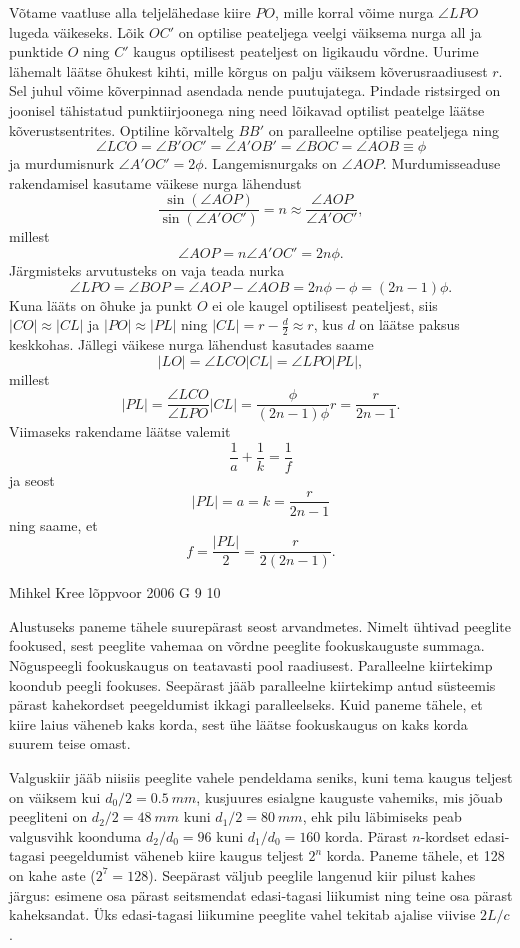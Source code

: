\documentclass[11pt]{article}
\begin{document}
{{Võtame vaatluse alla teljelähedase kiire $PO$, mille korral võime nurga $\angle LPO$ lugeda väikeseks. Lõik $OC'$ on optilise peateljega veelgi väiksema nurga all ja punktide $O$ ning $C'$ kaugus optilisest peateljest on ligikaudu võrdne. Uurime lähemalt läätse õhukest kihti, mille kõrgus on palju väiksem kõverusraadiusest $r$. Sel juhul võime kõverpinnad asendada nende puutujatega. Pindade ristsirged on joonisel tähistatud punktiirjoonega ning need lõikavad optilist peatelge läätse kõverustsentrites. Optiline kõrvaltelg $BB'$ on paralleelne optilise peateljega ning 
\[
\angle LCO=\angle B'OC'=\angle A'OB'=\angle BOC=\angle AOB\equiv \phi
\]
ja murdumisnurk $\angle A'OC'=2\phi$. Langemisnurgaks on $\angle AOP$. Murdumisseaduse rakendamisel kasutame väikese nurga lähendust 
\[
\frac{\sin(\angle AOP)}{\sin(\angle A'OC')}=n\approx \frac{\angle AOP}{\angle A'OC'},
\]
millest
\[
\angle AOP = n \angle A'OC'=2n\phi.
\]
Järgmisteks arvutusteks on vaja teada nurka
\[
\angle LPO=\angle BOP=\angle AOP - \angle AOB=2n\phi-\phi=(2n-1)\phi.
\]
Kuna lääts on õhuke ja punkt $O$ ei ole kaugel optilisest peateljest, siis $|CO|\approx|CL|$ ja $|PO|\approx|PL|$ ning $|CL|=r-\frac{d}{2}\approx r$, kus $d$ on läätse paksus keskkohas. Jällegi väikese nurga lähendust kasutades saame
\[
|LO|=\angle LCO|CL|=\angle LPO|PL|,
\]
millest
\[
|PL|=\frac{\angle LCO}{\angle LPO}|CL|=\frac{\phi}{(2n-1)\phi} r=\frac{r}{2n-1}.
\]
Viimaseks rakendame läätse valemit
\[
\frac{1}{a}+\frac{1}{k}=\frac{1}{f}
\]
ja seost
\[
|PL|=a=k=\frac{r}{2n-1}
\]
ning saame, et
\[
f=\frac{|PL|}{2}=\frac{r}{2(2n-1)}.
\]
\fi
}

{Mihkel Kree} %
{lõppvoor} %
{2006} %
{G 9} %
{10} %
{

\ifSolution
Alustuseks paneme tähele suurepärast seost arvandmetes. Nimelt ühtivad peeglite fookused, sest peeglite vahemaa on võrdne peeglite fookuskauguste summaga. Nõguspeegli fookuskaugus on teatavasti pool raadiusest. Paralleelne kiirtekimp koondub peegli fookuses. Seepärast jääb paralleelne kiirtekimp antud süsteemis pärast kahekordset peegeldumist ikkagi paralleelseks. Kuid paneme tähele, et kiire laius väheneb kaks korda, sest ühe läätse fookuskaugus on kaks korda suurem teise omast.

Valguskiir jääb niisiis peeglite vahele pendeldama seniks, kuni tema kaugus teljest on väiksem kui $d_0/2 = \SI{0.5}{mm}$, kusjuures esialgne kauguste vahemiks, mis jõuab peegliteni on $d_2/2 = \SI{48}{mm}$ kuni $d_1/2 = \SI{80}{mm}$, ehk pilu läbimiseks peab valgusvihk koonduma $d_2/d_0 = 96$ kuni $d_1/d_0 = 160$ korda. Pärast $n$-kordset edasi-tagasi peegeldumist väheneb kiire kaugus teljest $2^n$ korda. Paneme tähele, et 128 on kahe aste ($2^7 = 128$). Seepärast väljub peeglile langenud kiir pilust kahes järgus: esimene osa pärast seitsmendat edasi-tagasi liikumist ning teine osa pärast kaheksandat. Üks edasi-tagasi liikumine peeglite vahel tekitab ajalise viivise $2L/c$.

}}
\end{document}
